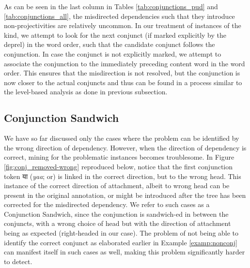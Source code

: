 As can be seen in the last column in Tables \ref{tab:conjunctions_pud} and \ref{tab:conjunctions_all}, the misdirected dependencies such that they introduce non-projectivities are relatively uncommon. In our treatment of instances of the kind, we attempt to look for the next conjunct (if marked explicitly by the deprel) in the word order, such that the candidate conjunct follows the conjunction. In case the conjunct is not explicitly marked, we attempt to associate the conjunction to the immediately preceding content word in the word order. This ensures that the misdirection is not resolved, but the conjunction is now closer to the actual conjuncts and thus can be found in a process similar to the level-based analysis as done in previous subsection.

\subsection{Conjunction Sandwich}
\label{sec:conj-sand}

We have so far discussed only the cases where the problem can be identified by the wrong direction of dependency. However, when the direction of dependency is correct, mining for the problematic instances becomes troublesome. In Figure \ref{fig:conj_removed-wrong} reproduced below, notice that the first conjunction token \texthindi{या} (\textit{yaa}; or) is linked in the correct direction, but to the wrong head. This instance of the correct direction of attachment, albeit to wrong head can be present in the original annotation, or might be introduced after the tree has been corrected for the misdirected dependency. We refer to such cases as a Conjunction Sandwich, since the conjunction is sandwich-ed in between the conjuncts, with a wrong choice of head but with the direction of attachment being as expected (right-headed in our case). The problem of not being able to identify the correct conjunct as elaborated earlier in Example \ref{examp:nonconj} can manifest itself in such cases as well, making this problem significantly harder to detect.

